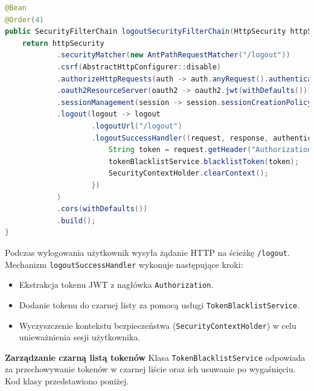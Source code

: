\begin{lstlisting}[language=Java, style=JavaStyle, caption=Konfiguracja łańcucha wylogowania]
@Bean
@Order(4)
public SecurityFilterChain logoutSecurityFilterChain(HttpSecurity httpSecurity) throws Exception {
    return httpSecurity
            .securityMatcher(new AntPathRequestMatcher("/logout"))
            .csrf(AbstractHttpConfigurer::disable)
            .authorizeHttpRequests(auth -> auth.anyRequest().authenticated())
            .oauth2ResourceServer(oauth2 -> oauth2.jwt(withDefaults()))
            .sessionManagement(session -> session.sessionCreationPolicy(SessionCreationPolicy.STATELESS))
            .logout(logout -> logout
                    .logoutUrl("/logout")
                    .logoutSuccessHandler((request, response, authentication) -> {
                        String token = request.getHeader("Authorization").replace("Bearer ", "");
                        tokenBlacklistService.blacklistToken(token);
                        SecurityContextHolder.clearContext();
                    })
            )
            .cors(withDefaults())
            .build();
}
\end{lstlisting}

Podczas wylogowania użytkownik wysyła żądanie HTTP na ścieżkę \texttt{/logout}. Mechanizm \texttt{logoutSuccessHandler} wykonuje następujące kroki:
\begin{itemize}
    \item Ekstrakcja tokenu JWT z nagłówka \texttt{Authorization}.
    \item Dodanie tokenu do czarnej listy za pomocą usługi \texttt{TokenBlacklistService}.
    \item Wyczyszczenie kontekstu bezpieczeństwa (\texttt{SecurityContextHolder}) w celu unieważnienia sesji użytkownika.
\end{itemize}

\noindent \textbf{Zarządzanie czarną listą tokenów}\newline
Klasa \texttt{TokenBlacklistService} odpowiada za przechowywanie tokenów w czarnej liście oraz ich usuwanie po wygaśnięciu. Kod klasy przedstawiono poniżej.

